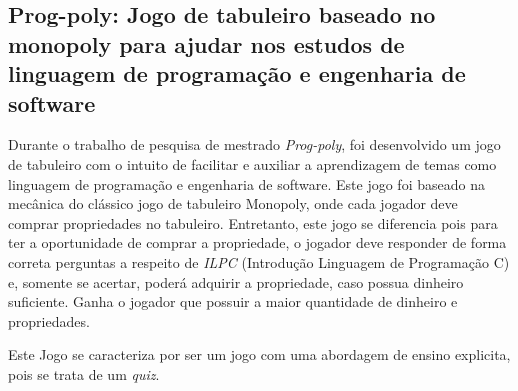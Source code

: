\subsection{Prog-poly: Jogo de tabuleiro baseado no monopoly para ajudar nos estudos de linguagem de programação e engenharia de software}

Durante o trabalho de pesquisa de mestrado \textit{Prog-poly}, foi desenvolvido um jogo de tabuleiro com o intuito de facilitar e auxiliar a aprendizagem de temas como linguagem de programação e engenharia de software. Este jogo foi baseado na mecânica do clássico jogo de tabuleiro Monopoly, onde cada jogador deve comprar propriedades no tabuleiro. Entretanto, este jogo se diferencia pois para ter a oportunidade de comprar a propriedade, o jogador deve responder de forma correta perguntas a respeito de \emph{ILPC} (Introdução Linguagem de Programação C) e, somente se acertar, poderá adquirir a propriedade, caso possua dinheiro suficiente. Ganha o jogador que possuir a maior quantidade de dinheiro e propriedades.

Este Jogo se caracteriza por ser um jogo com uma abordagem de ensino explicita, pois se trata de um \emph{quiz}. \cite{nascimento2022prog}


